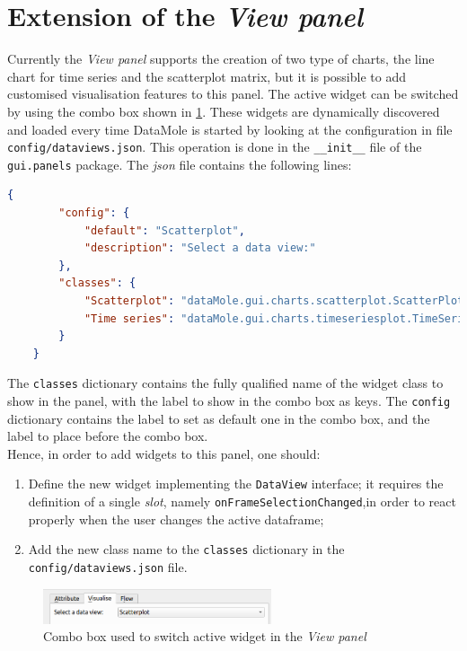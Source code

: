 \section{Extension of the \textit{View panel}}\label{sec:ext-view-panel}
Currently the \textit{View panel} supports the creation of two type of charts, the line chart for time series and the scatterplot matrix, but it is possible to add customised visualisation features to this panel. The active widget can be switched by using the combo box shown in \cref{fig:view-panel-extend}. These widgets are dynamically discovered and loaded every time DataMole is started by looking at the configuration in file \texttt{config/dataviews.json}. This operation is done in the \texttt{\_\_init\_\_} file of the \texttt{gui.panels} package. The \textit{json} file contains the following lines:
\begin{lstlisting}[language=json, frame=none, emph={config, classes}, emphstyle=\color{deepred}]
	{
		"config": {
			"default": "Scatterplot",
			"description": "Select a data view:"
		},
		"classes": {
			"Scatterplot": "dataMole.gui.charts.scatterplot.ScatterPlotMatrix",
			"Time series": "dataMole.gui.charts.timeseriesplot.TimeSeriesPlot"
		}
	}
\end{lstlisting}
The \texttt{classes} dictionary contains the fully qualified name of the widget class to show in the panel, with the label to show in the combo box as keys. The \texttt{config} dictionary contains the label to set as default one in the combo box, and the label to place before the combo box.\\
Hence, in order to add widgets to this panel, one should:
\begin{enumerate}
	\item Define the new widget implementing the \texttt{DataView} interface; it requires the definition of a single \textit{slot}, namely \texttt{onFrameSelectionChanged},in order to react properly when the user changes the active dataframe;
	\item Add the new class name to the \texttt{classes} dictionary in the \texttt{config/dataviews.json} file.
\end{enumerate}
\begin{figure}[hb]
	\centering
	\includegraphics[width=0.6\textwidth]{view-panel-extend}
	\caption{Combo box used to switch active widget in the \textit{View panel}}
	\label{fig:view-panel-extend}
\end{figure}

